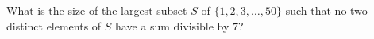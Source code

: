 What is the size of the largest subset $S$ of $\{1,2,3,\ldots,50\}$ such that no two distinct elements of $S$ have a sum divisible by $7$?
